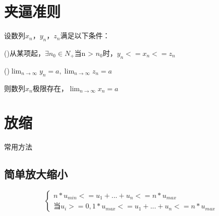 \section{夹逼准则}

设数列{\(x_n\)}，{\(y_n\)}，{\(z_n\)}满足以下条件：

()从某项起，\(\exists n_0 \in N_+\)当n > \(n_0\)时，\(y_n <= x_n <= z_n\)

()\(\displaystyle \lim_{n \to \infty}y_n = a, \displaystyle \lim_{n \to \infty}z_n = a\)

则数列{\(x_n\)}极限存在，\(\displaystyle \lim_{n \to \infty}x_n = a\)

\section{放缩}
常用方法

\subsection{简单放大缩小}
\[
\begin{cases}
n * u_{min} <= u_1 + ... + u_n <= n * u_{max} \\ 
\text{当}u_i >= 0, 1 * u_{max} <= u_1 + ... + u_n <= n * u_{max}
\end{cases}
\]

